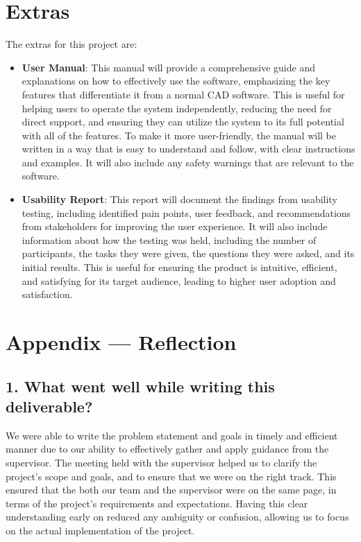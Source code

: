 \documentclass{article}
\begin{document}
\section{Extras}

The extras for this project are:

\begin{itemize}
    \item \textbf{User Manual}: This manual will provide a comprehensive guide and explanations on how to effectively use the software, emphasizing the key features that differentiate it from a normal CAD software. This is useful for helping users to operate the system independently, reducing the need for direct support, and ensuring they can utilize the system to its full potential with all of the features. To make it more user-friendly, the manual will be written in a way that is easy to understand and follow, with clear instructions and examples. It will also include any safety warnings that are relevant to the software.
    \item \textbf{Usability Report}: This report will document the findings from usability testing, including identified pain points, user feedback, and recommendations from stakeholders for improving the user experience. It will also include information about how the testing was held, including the number of participants, the tasks they were given, the questions they were asked, and its initial results. This is useful for ensuring the product is intuitive, efficient, and satisfying for its target audience, leading to higher user adoption and satisfaction.
\end{itemize}
\newpage{}

\section*{Appendix --- Reflection}

\subsection*{1. What went well while writing this deliverable?}
We were able to write the problem statement and goals in timely and efficient manner due to our ability to effectively gather and apply guidance from the supervisor. The meeting held with the supervisor helped us to clarify the project's scope and goals, and to ensure that we were on the right track. This ensured that the both our team and the supervisor were on the same page, in terms of the project's requirements and expectations. Having this clear understanding early on reduced any ambiguity or confusion, allowing us to focus on the actual implementation of the project.
\end{document}
